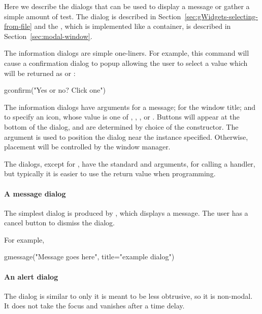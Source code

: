 Here we describe the dialogs that can be used to display a message or
gather a simple amount of test. The  dialog is
described in Section~\ref{sec:gWidgets-selecting-from-file} and the , which
is implemented like a container, is described in Section~\ref{sec:modal-window}.


The information dialogs are simple one-liners. For example, this
command will cause a confirmation dialog to popup allowing the user to
select a value which will be returned as  or :
\begin{Schunk}
\begin{Sinput}
 gconfirm("Yes or no? Click one")
\end{Sinput}
\end{Schunk}


The information dialogs have arguments 
for a message;  for the window title; and
 to specify an icon, whose value is one of
, , , or
. Buttons will appear at the bottom of the dialog, and
are determined by choice of the constructor. The
 argument is used to position the dialog
near the  instance specified. Otherwise, placement will
be controlled by the window manager.

The dialogs, except for , have the standard
 and  arguments, for calling a handler, but
typically it is easier to use the return value when programming.

\paragraph{A message dialog}
The simplest dialog is produced by , which
displays a message. The user has a cancel button to dismiss the dialog.


For example,
\begin{Schunk}
\begin{Sinput}
 gmessage("Message goes here", title="example dialog")
\end{Sinput}
\end{Schunk}


\paragraph{An alert dialog}
The  dialog is similar to  only it is
meant to be less obtrusive, so it is non-modal. It does not take the
focus and vanishes after a time delay.

